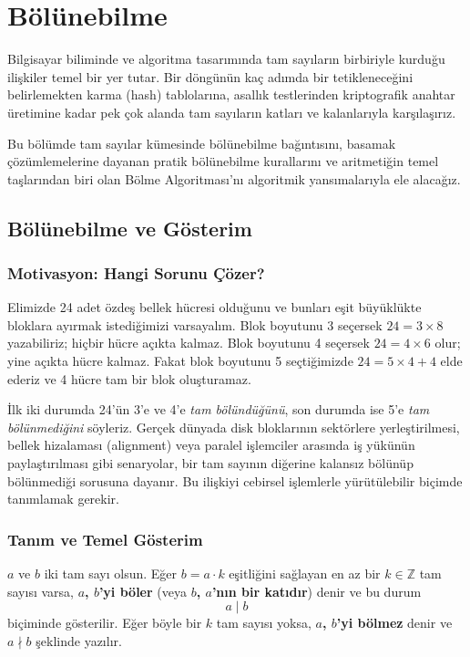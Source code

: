 \chapter[Bölünebilme · \textit{Temel}]{Bölünebilme}

Bilgisayar biliminde ve algoritma tasarımında tam sayıların birbiriyle kurduğu ilişkiler temel bir yer tutar. Bir döngünün kaç adımda bir tetikleneceğini belirlemekten karma (hash) tablolarına, asallık testlerinden kriptografik anahtar üretimine kadar pek çok alanda tam sayıların katları ve kalanlarıyla karşılaşırız. 

Bu bölümde tam sayılar kümesinde bölünebilme bağıntısını, basamak çözümlemelerine dayanan pratik bölünebilme kurallarını ve aritmetiğin temel taşlarından biri olan Bölme Algoritması'nı algoritmik yansımalarıyla ele alacağız.

\section{Bölünebilme ve Gösterim}

\subsection{Motivasyon: Hangi Sorunu Çözer?}
Elimizde 24 adet özdeş bellek hücresi olduğunu ve bunları eşit büyüklükte bloklara ayırmak istediğimizi varsayalım. Blok boyutunu 3 seçersek $24 = 3 \times 8$ yazabiliriz; hiçbir hücre açıkta kalmaz. Blok boyutunu 4 seçersek $24 = 4 \times 6$ olur; yine açıkta hücre kalmaz. Fakat blok boyutunu 5 seçtiğimizde $24 = 5 \times 4 + 4$ elde ederiz ve 4 hücre tam bir blok oluşturamaz.

İlk iki durumda 24'ün 3'e ve 4'e \emph{tam bölündüğünü}, son durumda ise 5'e \emph{tam bölünmediğini} söyleriz. Gerçek dünyada disk bloklarının sektörlere yerleştirilmesi, bellek hizalaması (alignment) veya paralel işlemciler arasında iş yükünün paylaştırılması gibi senaryolar, bir tam sayının diğerine kalansız bölünüp bölünmediği sorusuna dayanır. Bu ilişkiyi cebirsel işlemlerle yürütülebilir biçimde tanımlamak gerekir.

\subsection{Tanım ve Temel Gösterim}

\begin{definition}[Bölünebilme]
$a$ ve $b$ iki tam sayı olsun. Eğer $b = a \cdot k$ eşitliğini sağlayan en az bir $k \in \mathbb{Z}$ tam sayısı varsa, \textbf{$a$, $b$'yi böler} (veya \textbf{$b$, $a$'nın bir katıdır}) denir ve bu durum
\[
a \mid b
\]
biçiminde gösterilir. Eğer böyle bir $k$ tam sayısı yoksa, \textbf{$a$, $b$'yi bölmez} denir ve $a \nmid b$ şeklinde yazılır.
\end{definition}

